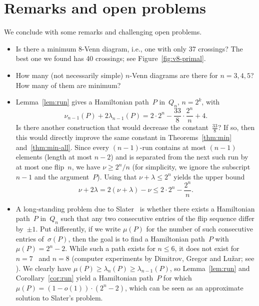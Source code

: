 \section{Remarks and open problems}
\label{sec:open}
%
We conclude with some remarks and challenging open problems.
%
\begin{itemize}[leftmargin=4mm]
\item
Is there a minimum 8-Venn diagram, i.e., one with only 37 crossings?
The best one we found has 40 crossings; see Figure~\ref{fig:v8-primal}.
%
\item
How many (not necessarily simple) $n$-Venn diagrams are there for $n=3,4,5$?
How many of them are minimum?
%
\item
Lemma~\ref{lem:run} gives a Hamiltonian path~$P$ in~$Q_n$, $n=2^k$, with
\[ \nu_{n-1}(P)+2\lambda_{n-1}(P)=2\cdot 2^n-\frac{33}{8}\cdot\frac{2^n}{n}+4. \]
Is there another construction that would decrease the constant~$\frac{33}{8}$?
If so, then this would directly improve the same constant in Theorems~\ref{thm:min} and~\ref{thm:min-all}.
%
Since every $(n-1)$-run contains at most $(n-1)$ elements (length at most $n-2$) and is separated from the next such run by at most one flip~$n$, we have $\nu\geq 2^n/n$ (for simplicity, we ignore the subscript~$n-1$ and the argument~$P$).
Using that $\nu+\lambda\le 2^n$ yields the upper bound
\[ \nu+2\lambda=2(\nu+\lambda)-\nu \le 2\cdot 2^n-\frac{2^n}{n}. \]
%
\item
A long-standing problem due to Slater~\cite{slater_1979} is whether there exists a Hamiltonian path~$P$ in~$Q_n$ such that any two consecutive entries of the flip sequence differ by~$\pm 1$.
Put differently, if we write $\mu(P)$ for the number of such consecutive entries of~$\sigma(P)$, then the goal is to find a Hamiltonian path~$P$ with $\mu(P)=2^n-2$.
While such a path exists for $n\le 6$, it does not exist for $n=7$~\cite{slater_1989} and $n=8$ (computer experiments by Dimitrov, Gregor and Lu\v{z}ar; see \cite[Problem~10]{MR4649606}).
We clearly have $\mu(P)\geq\lambda_n(P)\geq \lambda_{n-1}(P)$, so Lemma~\ref{lem:run} and Corollary~\ref{cor:run} yield a Hamiltonian path~$P$ for which $\mu(P)=(1-o(1))\cdot (2^n-2)$, which can be seen as an approximate solution to Slater's problem.
\end{itemize}
%
%
